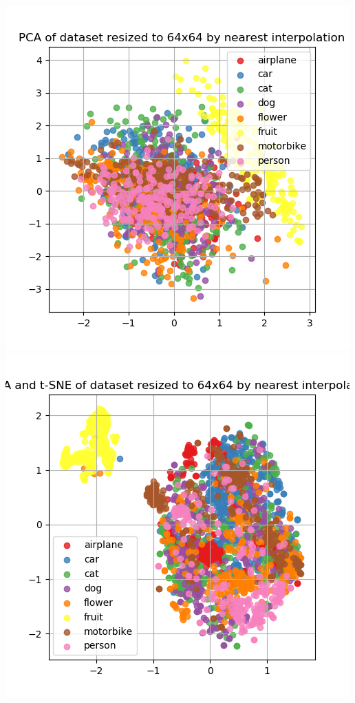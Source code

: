 \documentclass{article}
\begin{document}
\begin{minipage}[c]{\linewidth}
	\includegraphics[width=\figureWidth\textwidth]{./figures/pca_h64_w64_r_adasyn.png}
	\includegraphics[width=\figureWidth\textwidth]{./figures/pca_tsne_h64_w64_r_adasyn.png}

\end{minipage}
\end{document}
